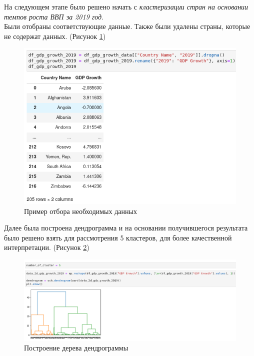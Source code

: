 \documentclass[14pt,fleqn]{extarticle}
\begin{document}
	\newpage
	
	На следующем этапе было решено начать с \textit{кластеризации стран на основании темпов роста ВВП за 2019 год}.\\
	
	Были отобраны соответствующие данные. Также были удалены страны, которые не содержат данных. (Рисунок \ref{fig:cluster_select_correct_data})
	
	\begin{figure}[h]
		\centering \includegraphics[scale=0.5]{cluster_select_correct_data}
		\caption{Пример отбора необходимых данных}
		\label{fig:cluster_select_correct_data}
	\end{figure}

	Далее была построена дендрограмма и на основании получившегося результата было решено взять для рассмотрения 5 кластеров, для более качественной интерпретации. (Рисунок \ref{fig:cluster_dendrogram})
	
	\begin{figure}[h]
		\centering \includegraphics[scale=0.5]{cluster_dendrogram}
		\caption{Построение дерева дендрограммы}
		\label{fig:cluster_dendrogram}
	\end{figure}
\end{document}
